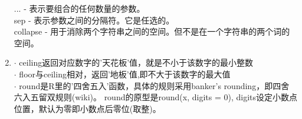 \documentclass[11pt,a4paper]{ctexart}
\begin{document}
\begin{appendices}
\begin{tcolorbox}[colback=pink!10!white,colframe=pink!100!black]
\begin{enumerate}
	... - 表示要组合的任何数量的参数。\\
	sep - 表示参数之间的分隔符。它是任选的。\\
	collapse - 用于消除两个字符串之间的空间。但不是在一个字符串的两个词的空间。\\
	\item $ \cdot $ ceiling返回对应数字的'天花板'值，就是不小于该数字的最小整数\\
	$ \cdot $ floor与ceiling相对，返回'地板'值,即不大于该数字的最大值\\
	$ \cdot $ round是R里的'四舍五入'函数，具体的规则采用banker's rounding，即四舍六入五留双规则(wiki)。
	round的原型是round(x, digits = 0), digits设定小数点位置，默认为零即小数点后零位(取整)。
\end{enumerate}
\end{tcolorbox}
\end{appendices}
\end{document}
